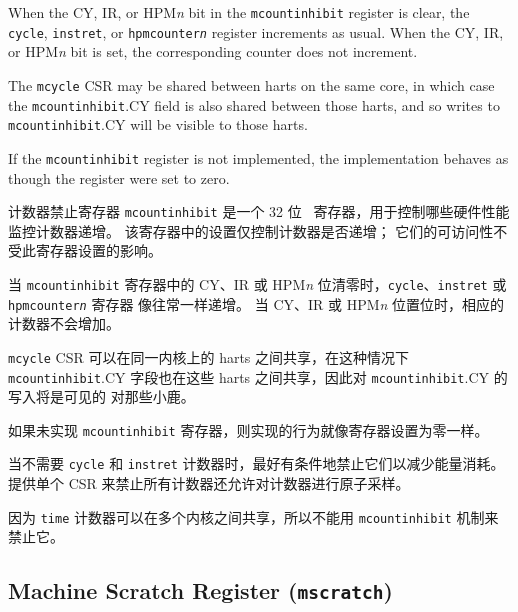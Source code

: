When the CY, IR, or HPM{\em n} bit in the {\tt mcountinhibit} register is
clear, the {\tt cycle}, {\tt instret}, or {\tt hpmcounter{\em n}} register
increments as usual.  When the CY, IR, or HPM{\em n} bit is set, the
corresponding counter does not increment.

The {\tt mcycle} CSR may be shared between harts on the same core, in which
case the {\tt mcountinhibit}.CY field is also shared between those harts,
and so writes to {\tt mcountinhibit}.CY will be visible to those harts.

If the {\tt mcountinhibit} register is not implemented, the implementation
behaves as though the register were set to zero.
\fi

计数器禁止寄存器 {\tt mcountinhibit} 是一个 32 位 \warl\ 寄存器，用于控制哪些硬件性能监控计数器递增。 该寄存器中的设置仅控制计数器是否递增； 它们的可访问性不受此寄存器设置的影响。

当 {\tt mcountinhibit} 寄存器中的 CY、IR 或 HPM{\em n} 位清零时，{\tt cycle}、{\tt instret} 或 {\tt hpmcounter{\em n}} 寄存器 像往常一样递增。 当 CY、IR 或 HPM{\em n} 位置位时，相应的计数器不会增加。

{\tt mcycle} CSR 可以在同一内核上的 harts 之间共享，在这种情况下 {\tt mcountinhibit}.CY 字段也在这些 harts 之间共享，因此对 {\tt mcountinhibit}.CY 的写入将是可见的 对那些小鹿。

如果未实现 {\tt mcountinhibit} 寄存器，则实现的行为就像寄存器设置为零一样。

\iffalse
\begin{commentary}
When the {\tt cycle} and {\tt instret} counters are not needed, it is
desirable to conditionally inhibit them to reduce energy consumption.
Providing a single CSR to inhibit all counters also allows the counters to be
atomically sampled.

Because the {\tt time} counter can be shared between multiple cores, it
cannot be inhibited with the {\tt mcountinhibit} mechanism.
\end{commentary}
\fi

\begin{commentary}
当不需要 {\tt cycle} 和 {\tt instret} 计数器时，最好有条件地禁止它们以减少能量消耗。 提供单个 CSR 来禁止所有计数器还允许对计数器进行原子采样。

因为 {\tt time} 计数器可以在多个内核之间共享，所以不能用 {\tt mcountinhibit} 机制来禁止它。
\end{commentary}


\subsection{Machine Scratch Register ({\tt mscratch})}

